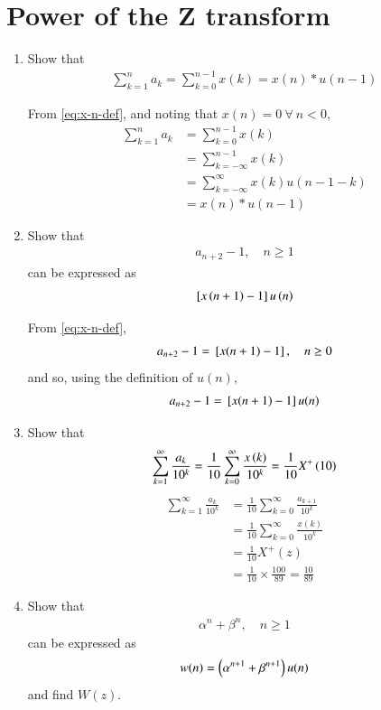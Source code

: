 \documentclass[journal,12pt,twocolumn]{IEEEtran}
\renewcommand\thesection{\arabic{section}}
\begin{document}
\section{Power of the Z transform}
\begin{enumerate}[label=\thesection.\arabic*,ref=\thesection.\theenumi]
\item Show that 
\begin{align}
	\sum_{k=1}^{n}a_k = 
	\sum_{k=0}^{n-1}x(k) = x(n)*u(n-1)
\end{align}

\solution From \eqref{eq:x-n-def}, and noting that $x(n) = 0\ \forall\ n < 0$,
\begin{align}
	\sum_{k=1}^{n}a_k &= \sum_{k=0}^{n-1}x(k) \\
	&= \sum_{k = -\infty}^{n - 1}x(k) \\
	&= \sum_{k = -\infty}^{\infty}x(k)u(n - 1 - k) \\
	&= x(n)*u(n - 1)
\end{align}
\item Show that 
\begin{align}
	a_{n+2}-1, \quad n \ge 1
\end{align}
can be expressed as 
\begin{align}
	{}\left[x\left(n+1\right)-1\right]u\left(n\right)
\end{align}

\solution From \eqref{eq:x-n-def},
\begin{align}
	a_{n+2} - 1 = {}\left[x(n + 1) - 1\right], \quad n \ge 0
\end{align}
and so, using the definition of $u(n)$,
\begin{align}
	a_{n+2} - 1 = {}\left[x(n + 1) - 1\right]u(n)
\end{align}

\item Show that 
\begin{align}
	\sum_{k=1}^{\infty}\frac{a_k}{10^k}= 
	\frac{1}{10}\sum_{k=0}^{\infty}\frac{x\left(k\right)}{10^k} =\frac{1}{10}X^{+}\left({10}\right)
\end{align}
\label{pr:1-2}
\solution 
\begin{align}
	\sum_{k=1}^{\infty}\frac{a_k}{10^k} &= \frac{1}{10}\sum_{k = 0}^{\infty}\frac{a_{k+1}}{10^k} \\
	&= \frac{1}{10}\sum_{k = 0}^{\infty}\frac{x(k)}{10^k} \\
	&= \frac{1}{10}X^+(z) \\
	&= \frac{1}{10}\times\frac{100}{89} = \frac{10}{89}
\end{align}
\item Show that 
\begin{align}
	\alpha^n + \beta^n, \quad n \ge 1
	\label{eq:yn-exp}
\end{align}
can be expressed as 
\begin{align}
	w(n) = \left(\alpha^{n+1} + \beta^{n+1}\right)u(n)
\end{align}
and find $W(z)$.


\end{enumerate}
\end{document}
